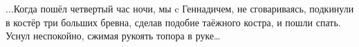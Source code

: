 



\begin{center}
\end{center}

$\ldots$Когда пошёл четвертый час ночи, мы c Геннадичем, не сговариваясь, подкинули в костёр три больших бревна, сделав подобие таёжного костра, и пошли спать. Уснул неспокойно, сжимая рукоять топора в руке\ldots 

\begin{center}
\end{center}
